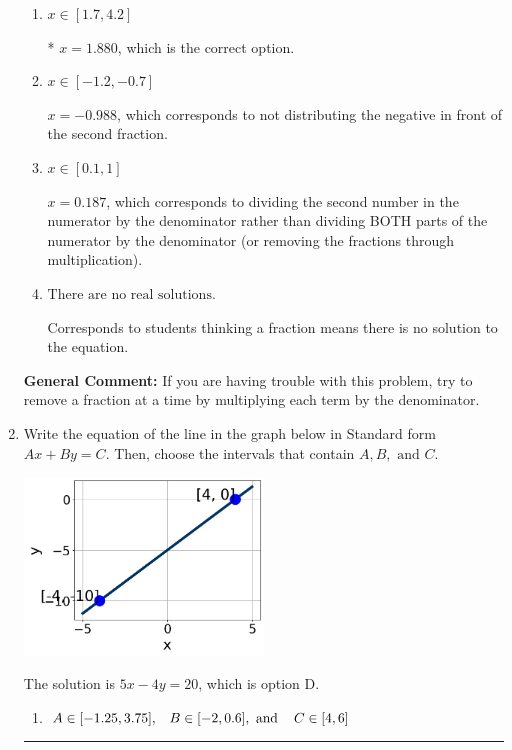 \documentclass{extbook}[14pt]
\newcommand{\litem}[1]{\item #1

\rule{\textwidth}{0.4pt}}
\begin{document}
\begin{enumerate}
{\begin{enumerate}[label=\Alph*.]
 $x = 15.618$, which corresponds to dividing the coefficients in front of x by the denominator rather than dividing BOTH parts of the numerator by the denominator (or removing the fractions through multiplication).
\item \( x \in [1.7, 4.2] \)

* $x = 1.880$, which is the correct option.
\item \( x \in [-1.2, -0.7] \)

 $x = -0.988$, which corresponds to not distributing the negative in front of the second fraction.
\item \( x \in [0.1, 1] \)

 $x = 0.187$, which corresponds to dividing the second number in the numerator by the denominator rather than dividing BOTH parts of the numerator by the denominator (or removing the fractions through multiplication).
\item \( \text{There are no real solutions.} \)

Corresponds to students thinking a fraction means there is no solution to the equation.
\end{enumerate}

\textbf{General Comment:} If you are having trouble with this problem, try to remove a fraction at a time by multiplying each term by the denominator.
}
\litem{
Write the equation of the line in the graph below in Standard form $Ax+By=C$. Then, choose the intervals that contain $A, B, \text{ and } C$.

\begin{center}
    \includegraphics[width=0.5\textwidth]{../Figures/linearGraphToStandardCopyC.png}
\end{center}



The solution is \( 5x - 4y = 20 \), which is option D.\begin{enumerate}[label=\Alph*.]
\item \( A \in [-1.25, 3.75], \hspace{3mm} B \in [-2, 0.6], \text{ and } \hspace{3mm} C \in [4, 6] \)


\end{enumerate}}
\end{enumerate}
\end{document}
